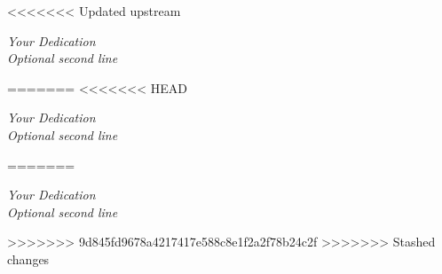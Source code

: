 <<<<<<< Updated upstream
\null\vfill
\begin{center}
\textsl{Your Dedication \\ Optional second line}
\end{center}
\vfill
=======
<<<<<<< HEAD
\null\vfill
\begin{center}
\textsl{Your Dedication \\ Optional second line}
\end{center}
\vfill
=======
\null\vfill
\begin{center}
\textsl{Your Dedication \\ Optional second line}
\end{center}
\vfill
>>>>>>> 9d845fd9678a4217417e588c8e1f2a2f78b24c2f
>>>>>>> Stashed changes
